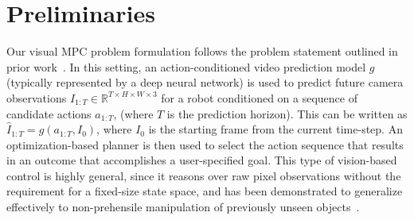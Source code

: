 \vspace{-0.1cm}
\section{Preliminaries}
\label{sec:prelim}
\vspace{-0.2cm}

Our visual MPC problem formulation follows the problem statement outlined in prior work~\cite{foresight}. In this setting, an action-conditioned video prediction model $g$ (typically represented by a deep neural network) is used to predict future camera observations $\hat{I}_{1:T} \in \mathbb{R}^{T \times H\times W \times 3}$ for a robot conditioned on a sequence of candidate actions $a_{1:T}$, (where $T$ is the prediction horizon). This can be written as $\hat{I}_{1:T} = g(a_{1:T}, I_0)$, where $I_0$ is the starting frame from the current time-step. An optimization-based planner is then used to select the action sequence that results in an outcome that accomplishes a user-specified goal. This type of vision-based control is highly general, since it reasons over raw pixel observations without the requirement for a fixed-size state space, and has been demonstrated to generalize effectively to non-prehensile manipulation of previously unseen objects~\cite{foresight,sna}.

